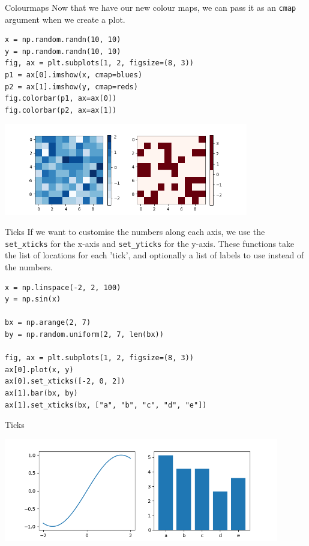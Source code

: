 \documentclass[10pt]{beamer}
\begin{document}
\begin{frame}[label={sec:org9f9b237},fragile]{Colourmaps}
 Now that we have our new colour maps, we can pass it as an \texttt{cmap} argument when we
create a plot.

\begin{verbatim}
x = np.random.randn(10, 10)
y = np.random.randn(10, 10)
fig, ax = plt.subplots(1, 2, figsize=(8, 3))
p1 = ax[0].imshow(x, cmap=blues)
p2 = ax[1].imshow(y, cmap=reds)
fig.colorbar(p1, ax=ax[0])
fig.colorbar(p2, ax=ax[1])
\end{verbatim}

\begin{center}
\includegraphics[width=0.8\textwidth]{images/colourmaps.png}
\end{center}
\end{frame}

\begin{frame}[label={sec:org08dbd4a},fragile]{Ticks}
 If we want to customise the numbers along each axis, we use the \texttt{set\_xticks} for
the x-axis and \texttt{set\_yticks} for the y-axis. These functions take the list of
locations for each 'tick', and optionally a list of labels to use instead of the numbers.

\begin{verbatim}
x = np.linspace(-2, 2, 100)
y = np.sin(x)

bx = np.arange(2, 7)
by = np.random.uniform(2, 7, len(bx))

fig, ax = plt.subplots(1, 2, figsize=(8, 3))
ax[0].plot(x, y)
ax[0].set_xticks([-2, 0, 2])
ax[1].bar(bx, by)
ax[1].set_xticks(bx, ["a", "b", "c", "d", "e"])
\end{verbatim}
\end{frame}

\begin{frame}[label={sec:org21bacdb}]{Ticks}
\begin{center}
\includegraphics[width=0.9\textwidth]{images/ticks.png}
\end{center}
\end{frame}
\end{document}
